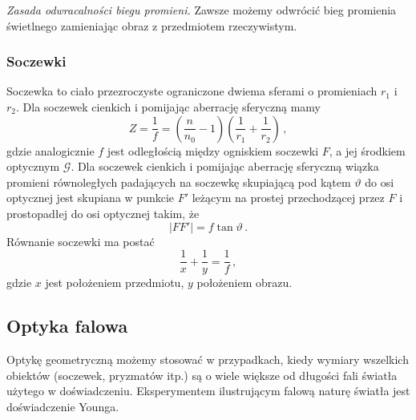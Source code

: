 \documentclass[../main.tex]{subfiles}
\begin{document}
\textit{Zasada odwracalności biegu promieni.} Zawsze możemy odwrócić bieg promienia świetlnego zamieniając obraz z przedmiotem rzeczywistym.
\subsubsection{Soczewki}
Soczewka to ciało przezroczyste ograniczone dwiema sferami o promieniach \(r_1\) i \(r_2\). Dla soczewek cienkich i pomijając aberrację sferyczną mamy
\begin{equation*}
    Z=\frac{1}{f}=\left(\frac{n}{n_0}-1\right)\left(\frac{1}{r_1}+\frac{1}{r_2}\right)\,,
\end{equation*}
gdzie analogicznie \(f\) jest odległością między ogniskiem soczewki \(F\), a jej środkiem optycznym \(\mathcal{G}\). Dla soczewek cienkich i pomijając aberrację sferyczną wiązka promieni równoległych padających na soczewkę skupiającą pod kątem \(\vartheta\) do osi optycznej jest skupiana w punkcie \(F'\) leżącym na prostej przechodzącej przez \(F\) i prostopadłej do osi optycznej takim, że
\begin{equation*}
    |FF'|=f\tan\vartheta\,.
\end{equation*}
Równanie soczewki ma postać
\begin{equation*}
    \frac{1}{x}+\frac{1}{y}=\frac{1}{f}\,,
\end{equation*}
gdzie \(x\) jest położeniem przedmiotu, \(y\) położeniem obrazu.

\subsection{Optyka falowa}
Optykę geometryczną możemy stosować w przypadkach, kiedy wymiary wszelkich obiektów (soczewek, pryzmatów itp.) są o wiele większe od długości fali światła użytego w doświadczeniu. Eksperymentem ilustrującym falową naturę światła jest doświadczenie Younga.
\end{document}
